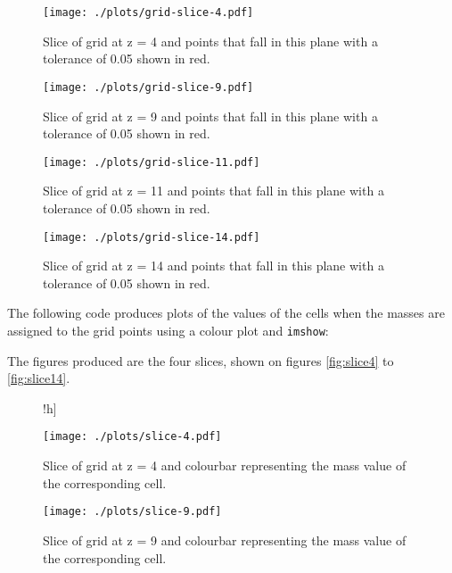 \documentclass{article}
\begin{document}


\begin{figure}[!h]
\centering
\begin{minipage}[t]{7.8cm}
    \centering
    \texttt{[image: ./plots/grid-slice-4.pdf]}
    \caption{Slice of grid at z = 4 and points that fall in this plane with a tolerance of 0.05 shown in red.}
    \label{fig:s4}
\end{minipage}
\qquad
\begin{minipage}[t]{7.8cm}
    \centering
    \texttt{[image: ./plots/grid-slice-9.pdf]}
    \caption{Slice of grid at z = 9 and points that fall in this plane with a tolerance of 0.05 shown in red.}
    \label{fig:s9}
\end{minipage}
\end{figure}

\begin{figure}[!h]
\centering
\begin{minipage}[t]{7.8cm}
    \centering
    \texttt{[image: ./plots/grid-slice-11.pdf]}
    \caption{Slice of grid at z = 11 and points that fall in this plane with a tolerance of 0.05 shown in red.}
    \label{fig:s11}
\end{minipage}
\qquad
\begin{minipage}[t]{7.8cm}
    \centering
    \texttt{[image: ./plots/grid-slice-14.pdf]}
    \caption{Slice of grid at z = 14 and points that fall in this plane with a tolerance of 0.05 shown in red.}
    \label{fig:s14}
\end{minipage}
\end{figure}

The following code produces plots of the values of the cells when the masses are assigned to the grid points using a colour plot and \verb+imshow+:


The figures produced are the four slices, shown on figures \ref{fig:slice4} to \ref{fig:slice14}.

\begin{figure}!h]
\centering
\begin{minipage}[t]{7.8cm}
    \centering
    \texttt{[image: ./plots/slice-4.pdf]}
    \caption{Slice of grid at z = 4 and colourbar representing the mass value of the corresponding cell.}
    \label{fig:slice4}
\end{minipage}
\qquad
\begin{minipage}[t]{7.8cm}
    \centering
    \texttt{[image: ./plots/slice-9.pdf]}
    \caption{Slice of grid at z = 9 and colourbar representing the mass value of the corresponding cell.}
    \label{fig:slice9}
\end{minipage}
\end{figure}
\end{document}
